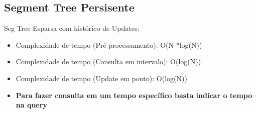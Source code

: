\documentclass[11pt, a4paper, oneside]{book}
\begin{document}
\hfill

\subsection{Segment Tree Persisente}


Seg Tree Esparsa com histórico de Updates:



\begin{itemize}
\item Complexidade de tempo (Pré-processamento): O(N *log(N))
\item Complexidade de tempo (Consulta em intervalo): O(log(N))
\item Complexidade de tempo (Update em ponto): O(log(N))
\item \textbf{Para fazer consulta em um tempo específico basta indicar o tempo na query}
\end{itemize}

\hfill
\end{document}
